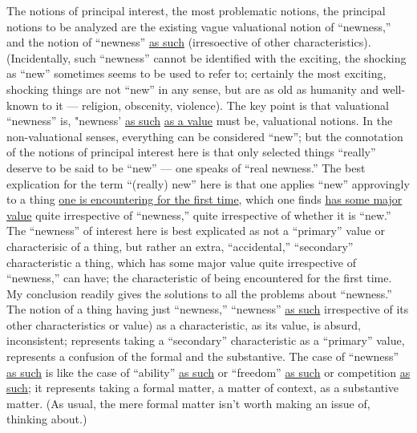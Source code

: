 The notions of principal interest, the most problematic 
notions, the principal notions to be analyzed are the existing
vague valuational notion of \enquote{newness,} and the notion of \enquote{newness}
\uline{as such} (irresoective of other characteristics). (Incidentally, 
such \enquote{newness} cannot be identified with the exciting, the shocking
as \enquote{new} sometimes seems to be used to refer to; certainly the
most exciting, shocking things are not \enquote{new} in any sense, but
are as old as humanity and well-known to it --- religion, obscenity,
violence). The key point is that valuational \enquote{newness} is, "newness'
\uline{as such} \uline{as a value} must be, valuational notions. In the
non-valuational senses, everything can be considered \enquote{new}; but
the connotation of the notions of principal interest here is that
only selected things \enquote{really} deserve to be said to be \enquote{new} ---
one speaks of \enquote{real newness.} The best explication for the term
\enquote{(really) new} here is that one applies \enquote{new} approvingly to a 
thing \uline{one is encountering for the first time}, which one finds 
\uline{has some major value} quite irrespective of \enquote{newness,} quite
irrespective of whether it is \enquote{new.} The \enquote{newness} of interest here 
is best explicated as not a \enquote{primary} value or characterisic of
a thing, but rather an extra, \enquote{accidental,} \enquote{secondary} characteristic
a thing, which has some major value quite irrespective
of \enquote{newness,} can have; the characteristic of being encountered
for the first time. My conclusion readily gives the solutions
to all the problems about \enquote{newness.} The notion of a thing having
just \enquote{newness,} \enquote{newness} \uline{as such} irrespective of its other
characteristics or value) as a characteristic, as its value,
is absurd, inconsistent; represents taking a \enquote{secondary} characteristic
as a \enquote{primary} value, represents a confusion of the
formal and the substantive. The case of \enquote{newness} \uline{as such} is like
the case of \enquote{ability} \uline{as such} or \enquote{freedom} \uline{as such} or competition
\uline{as such}; it represents taking a formal matter, a matter of context,
as a substantive matter. (As usual, the mere formal matter
isn't worth making an issue of, thinking about.) 

